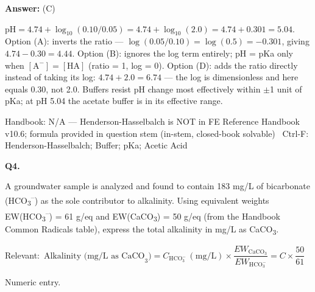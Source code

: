 \documentclass[11pt]{article}
\begin{document}
\vspace{2pt}\par\noindent\colorbox{boxbg}{\parbox{\dimexpr\linewidth-2\fboxsep\relax}{%
\vspace{2pt}\textbf{Answer:} (C)\par\vspace{2pt}
{\small $\mathrm{pH} = 4.74 + \log_{10}(0.10/0.05) = 4.74 + \log_{10}(2.0) = 4.74 + 0.301 = 5.04$. Option (A): inverts the ratio --- $\log(0.05/0.10) = \log(0.5) = -0.301$, giving $4.74-0.30 = 4.44$. Option (B): ignores the log term entirely; pH = pKa only when $[\mathrm{A}^-]=[\mathrm{HA}]$ (ratio = 1, log = 0). Option (D): adds the ratio directly instead of taking its log: $4.74 + 2.0 = 6.74$ --- the log is dimensionless and here equals 0.30, not 2.0. Buffers resist pH change most effectively within $\pm$1 unit of pKa; at pH 5.04 the acetate buffer is in its effective range.}\par\vspace{2pt}
{\footnotesize\color{soft}Handbook: N/A --- Henderson-Hasselbalch is NOT in FE Reference Handbook v10.6; formula provided in question stem (in-stem, closed-book solvable) \textbullet\ Ctrl-F: Henderson-Hasselbalch; Buffer; pKa; Acetic Acid}\vspace{2pt}
}}
\vspace{9pt}
\filbreak
\textbf{\color{accent}Q4.}\par\vspace{2pt}
A groundwater sample is analyzed and found to contain 183 mg/L of bicarbonate (HCO\textsubscript{3}\textsuperscript{--}) as the sole contributor to alkalinity. Using equivalent weights EW(HCO\textsubscript{3}\textsuperscript{--}) = 61 g/eq and EW(CaCO\textsubscript{3}) = 50 g/eq (from the Handbook Common Radicals table), express the total alkalinity in mg/L as CaCO\textsubscript{3}.\par\vspace{3pt}
{\small\color{soft}Relevant:}\ $\text{Alkalinity (mg/L as CaCO}_3) = C_{\mathrm{HCO}_3^-}\,(\mathrm{mg/L})\times\dfrac{EW_{\mathrm{CaCO}_3}}{EW_{\mathrm{HCO}_3^-}} = C\times\dfrac{50}{61}$\par\vspace{3pt}
{\small\color{soft}Numeric entry.}\par\vspace{3pt}
\end{document}
